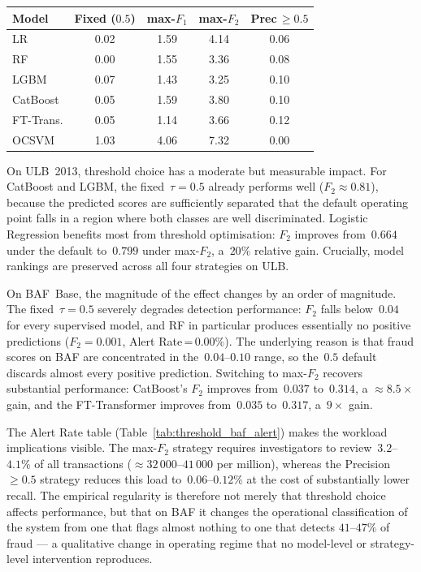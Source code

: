 \documentclass[a4paper,fleqn]{cas-sc}
\begin{document}
\par\medskip\noindent\begin{minipage}{\linewidth}\centering
{}
\label{tab:threshold_baf_alert}
\begin{tabular}{l c c c c}
\toprule
Model & Fixed ($0.5$) & max-$F_1$ & max-$F_2$ & Prec\,$\geq\!0.5$ \\
\midrule
LR         & 0.02 & 1.59 & 4.14 & 0.06 \\
RF         & 0.00 & 1.55 & 3.36 & 0.08 \\
LGBM       & 0.07 & 1.43 & 3.25 & 0.10 \\
CatBoost   & 0.05 & 1.59 & 3.80 & 0.10 \\
FT-Trans.  & 0.05 & 1.14 & 3.66 & 0.12 \\
OCSVM      & 1.03 & 4.06 & 7.32 & 0.00 \\
\bottomrule
\end{tabular}
\end{minipage}\par\medskip

On ULB~2013, threshold choice has a moderate but measurable impact. For CatBoost and
LGBM, the fixed~$\tau=0.5$ already performs well ($F_2\!\approx\!0.81$), because the
predicted scores are sufficiently separated that the default operating point falls in
a region where both classes are well discriminated. Logistic Regression benefits most
from threshold optimisation: $F_2$ improves from~$0.664$ under the default to~$0.799$
under max-$F_2$, a~$20\%$ relative gain. Crucially, model rankings are preserved across
all four strategies on ULB.

On BAF~Base, the magnitude of the effect changes by an order of magnitude. The
fixed~$\tau=0.5$ severely degrades detection performance: $F_2$ falls below~$0.04$ for
every supervised model, and RF in particular produces essentially no positive
predictions ($F_2\!=\!0.001$, Alert Rate\,=\,$0.00\%$). The underlying reason is that
fraud scores on BAF are concentrated in the~$0.04$--$0.10$ range, so the~$0.5$ default
discards almost every positive prediction. Switching to max-$F_2$ recovers substantial
performance: CatBoost's $F_2$ improves from~$0.037$ to~$0.314$, a ${\approx}8.5\times$
gain, and the FT-Transformer improves from~$0.035$ to~$0.317$, a~$9\times$ gain.

The Alert Rate table (Table~\ref{tab:threshold_baf_alert}) makes the workload
implications visible. The max-$F_2$ strategy requires investigators to review~$3.2$--$4.1\%$
of all transactions (${\approx}32\,000$--$41\,000$ per million), whereas the
Precision~$\geq\!0.5$ strategy reduces this load to~$0.06$--$0.12\%$ at the cost of
substantially lower recall. The empirical regularity is therefore not merely that
threshold choice affects performance, but that on BAF it changes the operational
classification of the system from one that flags almost nothing to one that detects
$41$--$47\%$ of fraud --- a qualitative change in operating regime that no model-level
or strategy-level intervention reproduces.
\end{document}

